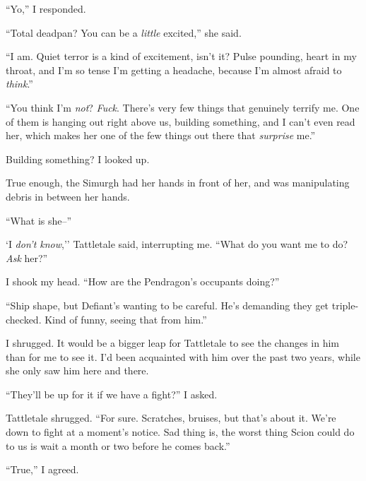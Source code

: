 ``Yo,'' I responded.



``Total deadpan?  You can be a \emph{little} excited,'' she said.



``I am.  Quiet terror is a kind of excitement, isn't it?  Pulse pounding, heart in my throat, and I'm so tense I'm getting a headache, because I'm almost afraid to \emph{think}.''



``You think I'm \emph{not}?  \emph{Fuck}.  There's very few things that genuinely terrify me.  One of them is hanging out right above us, building something, and I can't even read her, which makes her one of the few things out there that \emph{surprise }me.''



Building something?  I looked up.



True enough, the Simurgh had her hands in front of her, and was manipulating debris in between her hands.



``What is she--''



`I \emph{don't know},'' Tattletale said, interrupting me.  ``What do you want me to do?  \emph{Ask} her?''



I shook my head.  ``How are the Pendragon's occupants doing?''



``Ship shape, but Defiant's wanting to be careful.  He's demanding they get triple-checked.  Kind of funny, seeing that from him.''



I shrugged.  It would be a bigger leap for Tattletale to see the changes in him than for me to see it.  I'd been acquainted with him over the past two years, while she only saw him here and there.



``They'll be up for it if we have a fight?'' I asked.



Tattletale shrugged.  ``For sure.  Scratches, bruises, but that's about it.  We're down to fight at a moment's notice.  Sad thing is, the worst thing Scion could do to us is wait a month or two before he comes back.''



``True,'' I agreed.




